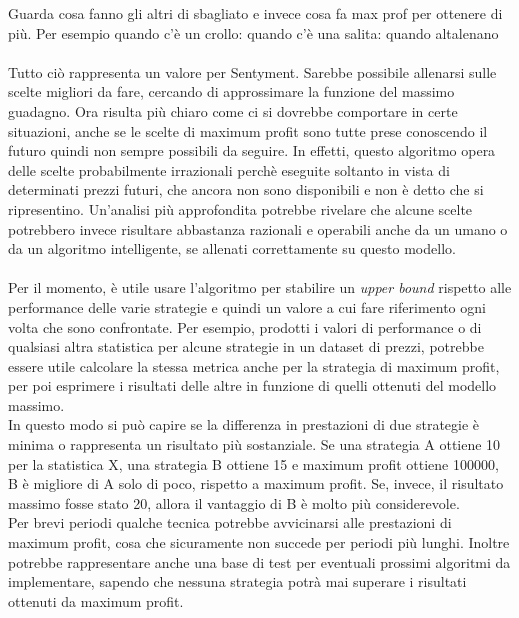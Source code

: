 \documentclass[a4paper,12pt]{report}
\begin{document}
\begin{fig}
Guarda cosa fanno gli altri di sbagliato e invece cosa fa max prof per ottenere di più.
Per esempio quando c'è un crollo:
quando c'è una salita:			%
quando altalenano
\\~\\


Tutto ciò rappresenta un valore per Sentyment. Sarebbe possibile allenarsi sulle scelte migliori da fare, cercando di approssimare la funzione del massimo guadagno. Ora risulta più chiaro come ci si dovrebbe comportare in certe situazioni, anche se le scelte di maximum profit sono tutte prese conoscendo il futuro quindi non sempre possibili da seguire. In effetti, questo algoritmo opera delle scelte probabilmente irrazionali perchè eseguite soltanto in vista di determinati prezzi futuri, che ancora non sono disponibili e non è detto che si ripresentino. Un'analisi più approfondita potrebbe rivelare che alcune scelte potrebbero invece risultare abbastanza razionali e operabili anche da un umano o da un algoritmo intelligente, se allenati correttamente su questo modello.\\~\\Per il momento, è utile usare l'algoritmo per stabilire un \textit{upper bound} rispetto alle performance delle varie strategie e quindi un valore a cui fare riferimento ogni volta che sono confrontate. Per esempio, prodotti i valori di performance o di qualsiasi altra statistica per alcune strategie in un dataset di prezzi, potrebbe essere utile calcolare la stessa metrica anche per la strategia di maximum profit, per poi esprimere i risultati delle altre in funzione di quelli ottenuti del modello massimo.\\ In questo modo si può capire se la differenza in prestazioni di due strategie è minima o rappresenta un risultato più sostanziale. Se una strategia A ottiene 10 per la statistica X, una strategia B ottiene 15 e maximum profit ottiene 100000, B è migliore di A solo di poco, rispetto a maximum profit. Se, invece, il risultato massimo fosse stato 20, allora il vantaggio di B è molto più considerevole.
\\ Per brevi periodi qualche tecnica potrebbe avvicinarsi alle prestazioni di maximum profit, cosa che sicuramente non succede per periodi più lunghi. Inoltre potrebbe rappresentare anche una base di test per eventuali prossimi algoritmi da implementare, sapendo che nessuna strategia potrà mai superare i risultati ottenuti da maximum profit.\\~\\
\begin{fig}

\end{fig}
\end{fig}
\end{document}
